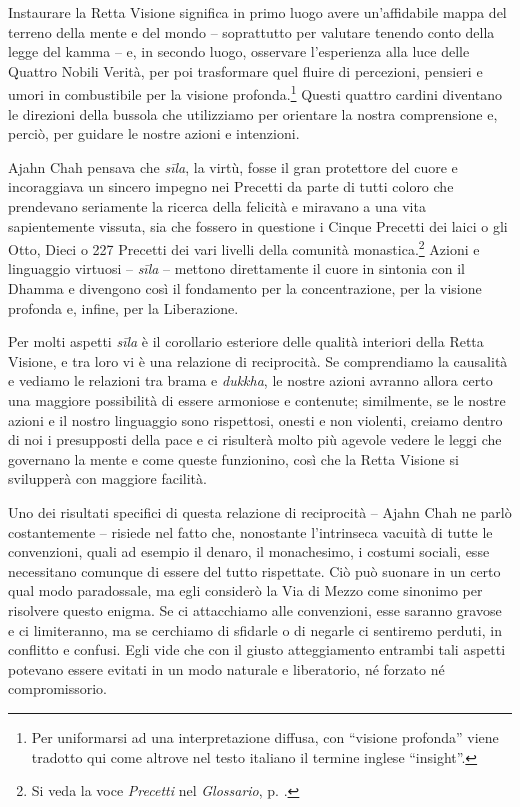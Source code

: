 Instaurare la Retta Visione significa in primo luogo avere un'affidabile
mappa del terreno della mente e del mondo -- soprattutto per valutare
tenendo conto della legge del kamma -- e, in secondo luogo,
osservare l'esperienza alla luce delle Quattro Nobili Verità, per poi
trasformare quel fluire di percezioni, pensieri e umori in combustibile
per la visione profonda.\footnote{Per uniformarsi ad una interpretazione
  diffusa, con ``visione profonda'' viene tradotto qui come altrove nel
  testo italiano il termine inglese ``insight''.} Questi quattro cardini
diventano le direzioni della bussola che utilizziamo per orientare la
nostra comprensione e, perciò, per guidare le nostre azioni e
intenzioni.

Ajahn Chah pensava che \emph{sīla}, la virtù, fosse il gran protettore
del cuore e incoraggiava un sincero impegno nei Precetti da parte di
tutti coloro che prendevano seriamente la ricerca della felicità e
miravano a una vita sapientemente vissuta, sia che fossero in questione
i Cinque Precetti dei laici o gli Otto, Dieci o 227 Precetti dei vari
livelli della comunità monastica.\footnote{Si veda la voce
  \emph{Precetti} nel \emph{Glossario}, p. \pageref{glossary-precetti}.} Azioni e linguaggio virtuosi --
\emph{sīla} -- mettono direttamente il cuore in sintonia con il Dhamma e
divengono così il fondamento per la concentrazione, per la visione
profonda e, infine, per la Liberazione.

Per molti aspetti \emph{sīla} è il corollario esteriore delle qualità
interiori della Retta Visione, e tra loro vi è una relazione di
reciprocità. Se comprendiamo la causalità e vediamo le relazioni tra
brama e \emph{dukkha}, le nostre azioni avranno allora certo una
maggiore possibilità di essere armoniose e contenute; similmente, se le
nostre azioni e il nostro linguaggio sono rispettosi, onesti e non
violenti, creiamo dentro di noi i presupposti della pace e ci risulterà
molto più agevole vedere le leggi che governano la mente e come queste
funzionino, così che la Retta Visione si svilupperà con maggiore
facilità.

Uno dei risultati specifici di questa relazione di reciprocità -- Ajahn
Chah ne parlò costantemente -- risiede nel fatto che, nonostante
l'intrinseca vacuità di tutte le convenzioni, quali ad esempio il
denaro, il monachesimo, i costumi sociali, esse necessitano comunque di
essere del tutto rispettate. Ciò può suonare in un certo qual modo
paradossale, ma egli considerò la Via di Mezzo come sinonimo per
risolvere questo enigma. Se ci attacchiamo alle convenzioni, esse
saranno gravose e ci limiteranno, ma se cerchiamo di sfidarle o di
negarle ci sentiremo perduti, in conflitto e confusi. Egli vide che con
il giusto atteggiamento entrambi tali aspetti potevano essere evitati in
un modo naturale e liberatorio, né forzato né compromissorio.

